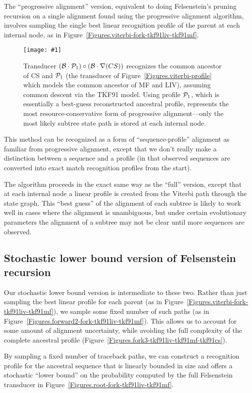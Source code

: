 \documentclass{article}
\newcommand{\figref}[1]{Figure~\ref{Figures.#1}}
\newcommand{\figlabel}[1]{\label{Figures.#1}}
\newcommand{\easyfig}[4]{
\begin{figure}
\texttt{[image: \#1]}
\caption{ \figlabel{#3} #4}
\end{figure}}
\newcommand{\widepdffig}[2]{\easyfig{#1-fig.pdf}{width=\textwidth}{#1}{#2}}
\newcommand\tkf{{\cal B}}
\newcommand\profile{{\cal P}}
\newcommand\fork{\circ}
\newcommand\recognize{\nabla}
\begin{document}
The ``progressive alignment'' version,
equivalent to doing Felsenstein's pruning recursion on a single alignment
found using the progressive alignment algorithm,
involves sampling the single best linear recognition profile of the parent
 at each internal node, 
as in \figref{viterbi-fork-tkf91liv-tkf91mf}.  

\widepdffig{fork-tkf91viterbi-tkf91cs}{Transducer $(\tkf \cdot \profile_1)\fork(\tkf \cdot \recognize(CS))$ recognizes the common ancestor of CS and $\profile_1$
(the transducer of \figref{viterbi-profile} which models the common ancestor of MF and LIV),
assuming common descent via the TKF91 model.  
Using profile $\profile_1$, which is essentially a best-guess reconstructed ancestral profile, represents the most resource-conservative form of progressive alignment---only the 
most likely subtree state path is stored at each internal node.  }

This method can be recognized as a form of ``sequence-profile''
 alignment as familiar from progressive alignment,
except that we don't really make a distinction between a sequence and a profile
(in that observed sequences are converted into exact match recognition
 profiles from the start).

The algorithm proceeds in the exact same way as the ``full'' version, 
except that at each internal node a linear profile is created from the Viterbi
path through the state graph.  This ``best guess'' of the alignment of each subtree
is likely to work well in cases where the alignment is unambiguous, but under
certain evolutionary parameters the alignment of a subtree may not be clear
until more sequences are observed. 

\subsection{Stochastic lower bound version of Felsenstein recursion}

Our stochastic lower bound version is intermediate to these two.
Rather than just sampling the best linear profile for each parent
(as in \figref{viterbi-fork-tkf91liv-tkf91mf}),
we sample some fixed number of such paths
(as in \figref{forward2-fork-tkf91liv-tkf91mf}).
This allows us to account for some amount of alignment uncertainty,
while avoiding the full complexity of the complete ancestral profile
(\figref{fork3-tkf91liv-tkf91mf-tkf91cs}).

By sampling a fixed number of traceback paths,
we can construct a recognition profile for the ancestral sequence
that is linearly bounded in size and offers a stochastic ``lower bound''
on the probability computed by the full Felsenstein transducer in \figref{root-fork-tkf91liv-tkf91mf}.
\end{document}
